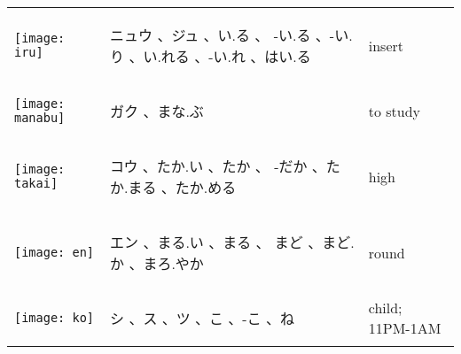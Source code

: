 \documentclass[a4paper,12pt]{extarticle}
\begin{document}
\begin{longtable}{|lp{6cm}p{4cm}|}
\begin{minipage}{0.3\textwidth}
\centerline{
	\texttt{[image: iru]}
}
\end{minipage}
&
\begin{CJK}{UTF8}{min} ニュウ 、ジュ 、い.る 、 -い.る 、-い.り 、い.れる 、-い.れ 、はい.る\end{CJK}
&
 insert
\\ 
\begin{minipage}{0.3\textwidth}
\centerline{
	\texttt{[image: manabu]}
}
\end{minipage}
&
\begin{CJK}{UTF8}{min}ガク 、まな.ぶ\end{CJK}
&
 to study
\\ 
\begin{minipage}{0.3\textwidth}
\centerline{
	\texttt{[image: takai]}
}
\end{minipage}
&
\begin{CJK}{UTF8}{min} コウ 、たか.い 、たか 、 -だか 、たか.まる  、たか.める\end{CJK}
&
 high
\\ 
\begin{minipage}{0.3\textwidth}
\centerline{
	\texttt{[image: en]}
}
\end{minipage}
&
\begin{CJK}{UTF8}{min} エン 、まる.い 、まる 、 まど 、まど.か 、まろ.やか\end{CJK}
&
 round
\\ 
\begin{minipage}{0.3\textwidth}
\centerline{
	\texttt{[image: ko]}
}
\end{minipage}
&
\begin{CJK}{UTF8}{min} シ 、ス 、ツ 、こ 、-こ 、ね\end{CJK}
&
 child; 11PM-1AM
\\ 

\end{longtable}
\end{document}

